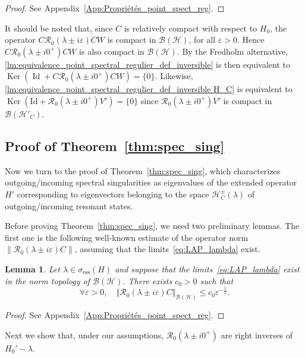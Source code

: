 \documentclass[10pt]{amsart}
\newtheorem{lemm}[theo]{Lemma}\newtheorem{prop}[theo]{Proposition}\newtheorem{coro}[theo]{Corollary}\newtheorem{conj}[theo]{Conjecture}
\theoremstyle{definition}\newtheorem{defi}[theo]{Definition}\newtheorem{rema}[theo]{Remark}\newtheorem{exam}[theo]{Example}\newtheorem{exem}[theo]{Example}\newtheorem{nota}[theo]{Notation}
\newcommand{\Hi}{\mathcal{H}}
\newcommand{\ess}{\mathrm{ess}}
\newcommand{\norme}[1]{\left\Vert #1\right\Vert}
\newcommand{\Res}{\mathcal{R}}
\newcommand{\clB}{\mathcal{B}}
\DeclareMathOperator{\Ker}{Ker}
\DeclareMathOperator{\Id}{Id}
\let\oldforall\forall
\renewcommand*{\forall}{\mathrel{\oldforall}}
\begin{document}
\begin{proof}
See Appendix~\ref{App:Propriétés_point_spect_reg}.
\end{proof}

It should be noted that, since $C$ is relatively compact with respect to $H_0$, the operator $C\Res_0(\lambda\pm i\varepsilon)CW$ is compact in $\clB(\Hi)$, for all $\varepsilon>0$. Hence $C\Res_0(\lambda\pm i0^+)CW$ is also compact in $\clB(\Hi)$. By the Fredholm alternative, \eqref{lm:equivalence_point_spectral_regulier_def_inversible} is then equivalent to $\Ker(\Id+C\Res_0(\lambda\pm i0^+)CW)=\{0\}$. Likewise, \eqref{lm:equivalence_point_spectral_regulier_def_inversible H_C} is equivalent to $\Ker(\mathrm{Id}+\Res_0(\lambda\pm i0^+)V')=\{0\}$ since $\Res_0(\lambda\pm i0^+)V'$ is compact in $\clB(\Hi'_C)$.

\subsection{Proof of Theorem~\ref{thm:spec_sing}} \label{sec:proof_thm_spec_sing}

Now we turn to the proof of Theorem~\ref{thm:spec_sing}, which characterizes outgoing/incoming spectral singularities as eigenvalues of the extended operator $H'$ corresponding to eigenvectors belonging to the space $\Hi_C^\pm(\lambda)$ of outgoing/incoming resonant states.

Before proving Theorem~\ref{thm:spec_sing}, we need two preliminary lemmas. The first one is the following well-known estimate of the operator norm $\|\Res_0(\lambda\pm i\varepsilon)C\|$, assuming that the limits~\eqref{eq:LAP_lambda} exist.

\begin{lemm}\label{lm:tech_est}
Let $\lambda\in \sigma_\ess(H)$ and suppose that the limits~\eqref{eq:LAP_lambda} exist in the norm topology of $\clB(\Hi)$. There exists $c_0>0$ such that
\begin{equation}\label{eq:Estimé_norme_C_resolvante_H_0}
\forall \varepsilon>0, \quad \norme{\Res_0\left(\lambda\pm i\varepsilon\right)C}_\mathcal{\clB(\Hi)}\leq c_0\varepsilon^{-\frac12}.
\end{equation}
\end{lemm}

\begin{proof}
See Appendix~\ref{App:Propriétés_point_spect_reg}.
\end{proof}

Next we show that, under our assumptions, $\Res_0(\lambda\pm i0^+)$ are right inverses of $H_0'-\lambda$.
\end{document}
